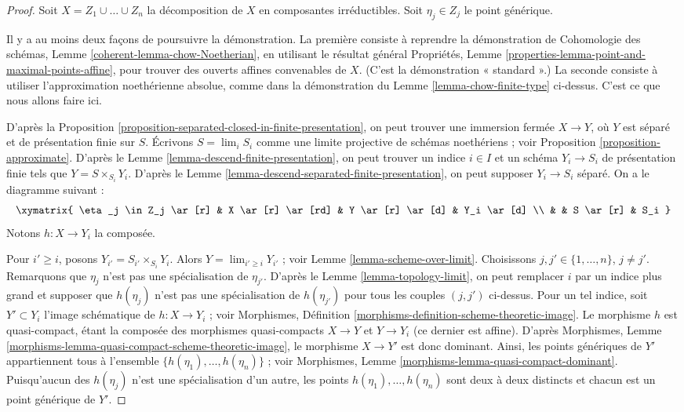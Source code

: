 \begin{proof}
Soit $X = Z_1 \cup \ldots \cup Z_n$ la décomposition de $X$
en composantes irréductibles. Soit $\eta_j \in Z_j$ le point générique.

\medskip\noindent
Il y a au moins deux façons de poursuivre la démonstration.
La première consiste à reprendre la démonstration de
Cohomologie des schémas, Lemme \ref{coherent-lemma-chow-Noetherian},
en utilisant le résultat général
Propriétés, Lemme \ref{properties-lemma-point-and-maximal-points-affine},
pour trouver des ouverts affines convenables de $X$. (C'est la démonstration « standard ».)
La seconde consiste à utiliser l'approximation noethérienne absolue, comme dans
la démonstration du Lemme \ref{lemma-chow-finite-type} ci-dessus.
C'est ce que nous allons faire ici.

\medskip\noindent
D'après la Proposition \ref{proposition-separated-closed-in-finite-presentation},
on peut trouver une immersion fermée $X \to Y$, où $Y$ est séparé
et de présentation finie sur $S$.
Écrivons $S = \lim_i S_i$ comme une limite projective de schémas noethériens ; voir
Proposition \ref{proposition-approximate}. D'après le
Lemme \ref{lemma-descend-finite-presentation}, on peut
trouver un indice $i \in I$ et un schéma $Y_i \to S_i$ de présentation finie
tels que $Y = S \times_{S_i} Y_i$.
D'après le Lemme \ref{lemma-descend-separated-finite-presentation},
on peut supposer $Y_i \to S_i$ séparé.
On a le diagramme suivant :
$$
\xymatrix{
\eta_j \in Z_j \ar[r] & X \ar[r] \ar[rd] & Y \ar[r] \ar[d] & Y_i \ar[d] \\
& & S \ar[r] & S_i
}
$$
Notons $h : X \to Y_i$ la composée.

\medskip\noindent
Pour $i' \geq i$, posons $Y_{i'} = S_{i'} \times_{S_i} Y_i$.
Alors $Y = \lim_{i' \geq i} Y_{i'}$ ; voir
Lemme \ref{lemma-scheme-over-limit}.
Choisissons $j, j' \in \{1, \ldots, n\}$, $j \not = j'$.
Remarquons que $\eta_j$ n'est pas une spécialisation de $\eta_{j'}$.
D'après le Lemme \ref{lemma-topology-limit},
on peut remplacer $i$ par un indice plus grand et supposer
que $h(\eta_j)$ n'est pas une spécialisation de $h(\eta_{j'})$
pour tous les couples $(j, j')$ ci-dessus.
Pour un tel indice, soit
$Y' \subset Y_i$ l'image schématique de
$h : X \to Y_i$ ; voir
Morphismes, Définition \ref{morphisms-definition-scheme-theoretic-image}.
Le morphisme $h$ est quasi-compact, étant la composée des morphismes quasi-compacts
$X \to Y$ et $Y \to Y_i$ (ce dernier est affine).
D'après
Morphismes, Lemme \ref{morphisms-lemma-quasi-compact-scheme-theoretic-image},
le morphisme $X \to Y'$ est donc dominant. Ainsi, les points génériques
de $Y'$ appartiennent tous à l'ensemble
$\{h(\eta_1), \ldots, h(\eta_n)\}$ ; voir
Morphismes, Lemme \ref{morphisms-lemma-quasi-compact-dominant}.
Puisqu'aucun des $h(\eta_j)$ n'est une spécialisation d'un autre,
les points $h(\eta_1), \ldots, h(\eta_n)$ sont deux à deux
distincts et chacun est un point générique de $Y'$.


\end{proof}
